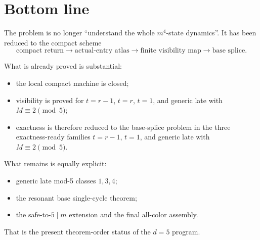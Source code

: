\documentclass[11pt]{article}
\newcommand{\1}{\mathbf 1}
\begin{document}
\section{Bottom line}

The problem is no longer ``understand the whole \(m^4\)-state dynamics''.
It has been reduced to the compact scheme
\[
\text{compact return}
\longrightarrow
\text{actual-entry atlas}
\longrightarrow
\text{finite visibility map}
\longrightarrow
\text{base splice}.
\]

What is already proved is substantial:

\begin{itemize}[leftmargin=2.4em]
\item the local compact machine is closed;
\item visibility is proved for \(t=r-1\), \(t=r\), \(t=1\), and generic late with \(M\equiv 2\pmod 5\);
\item exactness is therefore reduced to the base-splice problem in the three exactness-ready families \(t=r-1\), \(t=1\), and generic late with \(M\equiv 2\pmod 5\).
\end{itemize}

What remains is equally explicit:

\begin{itemize}[leftmargin=2.4em]
\item generic late mod-5 classes \(1,3,4\);
\item the resonant base single-cycle theorem;
\item the safe-to-\(5\mid m\) extension and the final all-color assembly.
\end{itemize}

That is the present theorem-order status of the \(d=5\) program.
\end{document}
